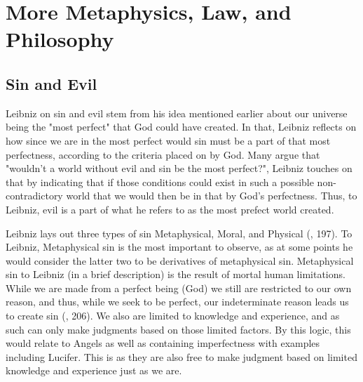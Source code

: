 \documentclass[12pt]{report}
\begin{document}
\chapter{More Metaphysics, Law, and Philosophy}
    
\section*{Sin and Evil}
Leibniz on sin and evil stem from his idea mentioned earlier about our universe being the "most perfect" that God could have created.
In that, Leibniz reflects on how since we are in the most perfect would sin must be a part of that most perfectness, according to the criteria placed on by God.
Many argue that "wouldn't a world without evil and sin be the most perfect?", Leibniz touches on that by indicating that if those conditions could exist in such a possible non-contradictory world that we would then be in that by God's perfectness.
Thus, to Leibniz, evil is a part of what he refers to as the most prefect world created.\\ \par
Leibniz lays out three types of sin Metaphysical, Moral, and Physical (, 197).
To Leibniz, Metaphysical sin is the most important to observe, as at some points he would consider the latter two to be derivatives of metaphysical sin.
Metaphysical sin to Leibniz (in a brief description) is the result of mortal human limitations.
While we are made from a perfect being (God) we still are restricted to our own reason, and thus, while we seek to be perfect, our indeterminate reason leads us to create sin (, 206).
We also are limited to knowledge and experience, and as such can only make judgments based on those limited factors. 
By this logic, this would relate to Angels as well as containing imperfectness with examples including Lucifer. This is as they are also free to make judgment based on limited knowledge and experience just as we are.
\end{document}

